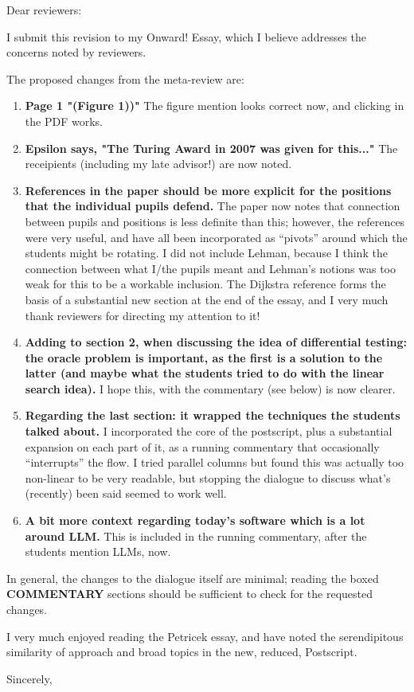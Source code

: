 \documentclass{letter}
\begin{document}
\begin{letter}{}
\opening{Dear reviewers:}

I submit this revision to my Onward! Essay, which I believe addresses the concerns noted by reviewers.

The proposed changes from the meta-review are:

\begin{enumerate}

\item {\bf Page 1 "(Figure 1))"} The figure mention looks correct now, and clicking in the PDF works.

\item {\bf Epsilon says, "The Turing Award in 2007 was given for this..."}  The receipients (including my late advisor!) are now noted.

\item {\bf  References in the paper should be more explicit for the positions that the individual pupils defend.}  The paper now notes that connection between pupils and positions is less definite than this; however, the references were very useful, and have all been incorporated as ``pivots'' around which the students might be rotating.  I did not include Lehman, because I think the connection between what I/the pupils meant and Lehman's notions was too weak for this to be a workable inclusion.  The Dijkstra reference forms the basis of a substantial new section at the end of the essay, and I very much thank reviewers for directing my attention to it!

\item {\bf Adding to section 2, when discussing the idea of differential testing: the oracle problem is important, as the first is a solution to the latter (and maybe what the students tried to do with the linear search idea).}  I hope this, with the commentary (see below) is now clearer.

\item {\bf Regarding the last section: it wrapped the techniques the students talked about.}  I incorporated the core of the postscript, plus a substantial expansion on each part of it, as a running commentary that occasionally ``interrupts'' the flow.  I tried parallel columns but found this was actually too non-linear to be very readable, but stopping the dialogue to discuss what's (recently) been said seemed to work well.

\item {\bf A bit more context regarding today's software which is a lot around LLM.}  This is included in the running commentary, after the students mention LLMs, now.

\end{enumerate}

In general, the changes to the dialogue itself are minimal; reading the boxed {\bf COMMENTARY} sections should be sufficient to check for the requested changes.

  I very much enjoyed reading the Petricek essay, and have noted the serendipitous similarity of approach and broad topics in the new, reduced, Postscript.

\closing{Sincerely,}



\end{letter}
\end{document}
